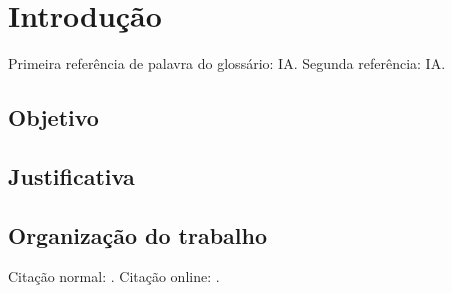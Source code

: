 
\chapter[Introdução]{Introdução}
    Primeira referência de palavra do glossário: \gls{IA}. Segunda referência:  
    \gls{IA}.
    \section{Objetivo}
    \section{Justificativa}
    \section{Organização do trabalho}
    Citação normal: \cite{chawdhary_simple_2014}. Citação online: .